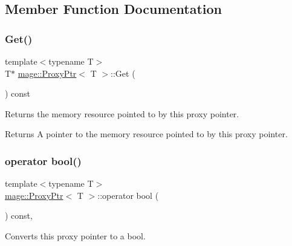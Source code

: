 \subsection{Member Function Documentation}
\hypertarget{classmage_1_1_proxy_ptr_a9af6f8e3b1f1aa9d5b323ed01fb9b40d}{}\label{classmage_1_1_proxy_ptr_a9af6f8e3b1f1aa9d5b323ed01fb9b40d} 
\subsubsection{\texorpdfstring{Get()}{Get()}}
{\footnotesize\ttfamily template$<$typename T$>$ \\
T$\ast$ \hyperlink{classmage_1_1_proxy_ptr}{mage\+::\+Proxy\+Ptr}$<$ T $>$\+::Get (\begin{DoxyParamCaption}{ }\end{DoxyParamCaption}) const\hspace{0.3cm}{\ttfamily [noexcept]}}

Returns the memory resource pointed to by this proxy pointer.

\begin{DoxyReturn}{Returns}
A pointer to the memory resource pointed to by this proxy pointer. 
\end{DoxyReturn}
\hypertarget{classmage_1_1_proxy_ptr_ac1226dcf54a735bb5da12273c38e9b8f}{}\label{classmage_1_1_proxy_ptr_ac1226dcf54a735bb5da12273c38e9b8f} 
\subsubsection{\texorpdfstring{operator bool()}{operator bool()}}
{\footnotesize\ttfamily template$<$typename T$>$ \\
\hyperlink{classmage_1_1_proxy_ptr}{mage\+::\+Proxy\+Ptr}$<$ T $>$\+::operator bool (\begin{DoxyParamCaption}{ }\end{DoxyParamCaption}) const\hspace{0.3cm}{\ttfamily [explicit]}, {\ttfamily [noexcept]}}

Converts this proxy pointer to a {\ttfamily bool}. \hypertarget{classmage_1_1_proxy_ptr_a14c1832a1f6b48c69337931d49bf3676}{}\label{classmage_1_1_proxy_ptr_a14c1832a1f6b48c69337931d49bf3676} 
